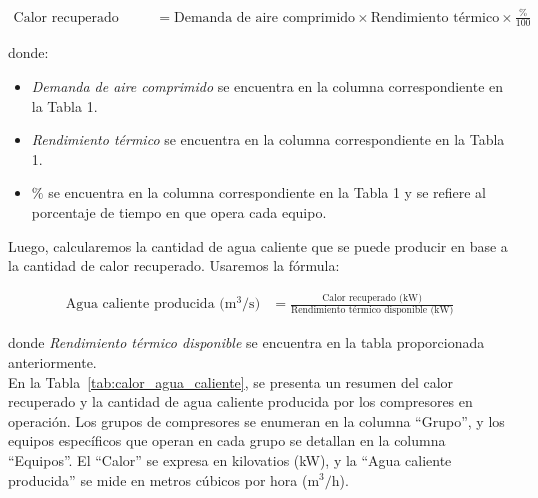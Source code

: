 \documentclass[11pt,a4paper]{article}  %
\begin{document}
\begin{align*}
\text{Calor recuperado (kW)} &= \text{Demanda de aire comprimido} \times \text{Rendimiento térmico} \times \frac{\%}{100}
\end{align*}

donde:
\begin{itemize}
    \item \textit{Demanda de aire comprimido} se encuentra en la columna correspondiente en la Tabla 1.
    \item \textit{Rendimiento térmico} se encuentra en la columna correspondiente en la Tabla 1.
    \item $\%$ se encuentra en la columna correspondiente en la Tabla 1 y se refiere al porcentaje de tiempo en que opera cada equipo.
\end{itemize}

Luego, calcularemos la cantidad de agua caliente que se puede producir en base a la cantidad de calor recuperado. Usaremos la fórmula:

\begin{align*}
\text{Agua caliente producida ($\text{m}^3\text{/s}$)} &= \frac{\text{Calor recuperado (kW)}}{\text{Rendimiento térmico disponible (kW)}}
\end{align*}

donde \textit{Rendimiento térmico disponible} se encuentra en la tabla proporcionada anteriormente.\\

 En la Tabla~\ref{tab:calor_agua_caliente}, se presenta un resumen del calor recuperado y la cantidad de agua caliente producida por los compresores en operación. Los grupos de compresores se enumeran en la columna ``Grupo'', y los equipos específicos que operan en cada grupo se detallan en la columna ``Equipos''. El ``Calor'' se expresa en kilovatios (kW), y la ``Agua caliente producida'' se mide en metros cúbicos por hora ($\text{m}^3\text{/h}$).\\
\end{document}
